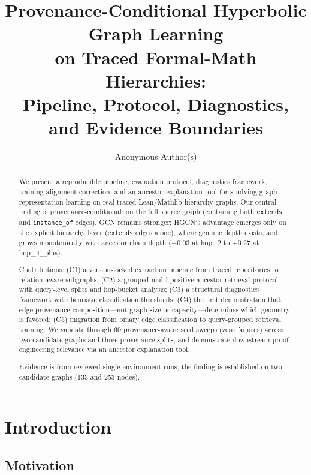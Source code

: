 \documentclass[runningheads]{llncs}
\begin{document}
\title{Provenance-Conditional Hyperbolic Graph Learning\\on Traced Formal-Math Hierarchies:\\Pipeline, Protocol, Diagnostics, and Evidence Boundaries}

\author{Anonymous Author(s)}
\maketitle

\begin{abstract}
We present a reproducible pipeline, evaluation protocol, diagnostics framework, training alignment correction, and an ancestor explanation tool for studying graph representation learning on real traced Lean/Mathlib hierarchy graphs.
Our central finding is provenance-conditional: on the full source graph (containing both \texttt{extends} and \texttt{instance\_of} edges), GCN remains stronger; HGCN's advantage emerges only on the explicit hierarchy layer (\texttt{extends} edges alone), where genuine depth exists, and grows monotonically with ancestor chain depth (+0.03 at hop\_2 to +0.27 at hop\_4\_plus).

Contributions: (C1) a version-locked extraction pipeline from traced repositories to relation-aware subgraphs; (C2) a grouped multi-positive ancestor retrieval protocol with query-level splits and hop-bucket analysis; (C3) a structural diagnostics framework with heuristic classification thresholds; (C4) the first demonstration that edge provenance composition---not graph size or capacity---determines which geometry is favored; (C5) migration from binary edge classification to query-grouped retrieval training.
We validate through 60 provenance-aware seed sweeps (zero failures) across two candidate graphs and three provenance splits, and demonstrate downstream proof-engineering relevance via an ancestor explanation tool.

Evidence is from reviewed single-environment runs; the finding is established on two candidate graphs (133 and 253 nodes).
\end{abstract}

\section{Introduction}

\subsection{Motivation}
\end{document}
